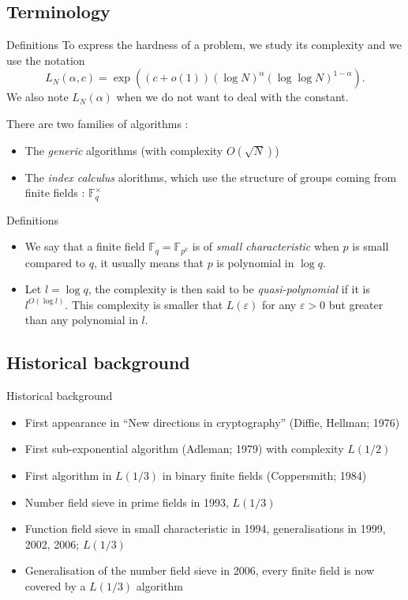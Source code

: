 \documentclass[xcolor=x11names,compress]{beamer}
\theoremstyle{break}
\theoremstyle{sc}
\theoremstyle{definition}
\theoremstyle{remark}
\begin{document}
\subsection{Terminology}
\begin{frame}{Definitions}
  To express the hardness of a problem, we study its complexity and we use the
  notation
  \[
    L_N(\alpha, c) = \exp((c+o(1))(\log N)^\alpha(\log\log N)^{1-\alpha}).
  \]
  We also note $L_N(\alpha)$ when we do not want to deal with the constant.

  There are two families of algorithms :
  \begin{itemize}
    \item The \emph{generic} algorithms (with complexity $O(\sqrt N)$)
    \item The \emph{index calculus} alorithms, which use the structure
      of groups coming from finite fields : $\mathbb{F}_{q}^\times$
  \end{itemize}
\end{frame}

\begin{frame}{Definitions}
  \begin{itemize}
    \item We say that a finite field $\mathbb{F}_q=\mathbb{F}_{p^k}$ is of
      \emph{small characteristic} when $p$ is small compared to $q$, it usually
      means that $p$ is polynomial in $\log q$.
    \item Let $l = \log q$, the complexity is then said to be
      \emph{quasi-polynomial} if it is
  $l^{O(\log l)}$. This complexity is smaller that $L(\varepsilon)$ for any
  $\varepsilon>0$ but greater than any polynomial in $l$.
  \end{itemize}
\end{frame}

\subsection{Historical background}
\begin{frame}{Historical background}
  \begin{itemize}
    \item First appearance in ``New directions in cryptography'' (Diffie, Hellman; 1976)
    \item First sub-exponential algorithm (Adleman; 1979) with complexity
      $L(1/2)$
  \item First algorithm in $L(1/3)$ in binary finite fields
    (Coppersmith; 1984)
  \item Number field sieve in prime fields in 1993,
    $L(1/3)$
  \item Function field sieve in small characteristic in 1994,
    generalisations in 1999, 2002, 2006; $L(1/3)$
  \item Generalisation of the number field sieve in 2006, every finite
    field is now covered by a $L(1/3)$ algorithm
  \end{itemize}
\end{frame}
\end{document}
